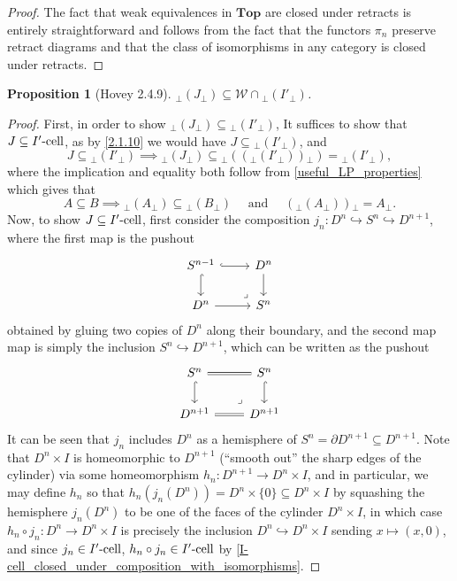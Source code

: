 \documentclass{amsart}
\theoremstyle{plain}
\newtheorem{proposition}[theorem]{Proposition}
\theoremstyle{definition}
\newcommand{\Top}{\mbf{Top}}
\newcommand{\sseq}{\subseteq}
\newcommand{\0}{\mathbf{0}}
\newcommand{\p}{{_\perp}}
\newcommand{\into}{\hookrightarrow}
\newcommand{\cW}{\mathcal W}
\newcommand{\mbf}[1]{\mathbf{#1}}
\renewcommand{\(}{\left(}
\renewcommand{\)}{\right)}
\newcommand{\cell}{\text-\mathrm{cell}}
\begin{document}
\begin{proof}
  The fact that weak equivalences in $\Top$ are closed under retracts is entirely straightforward and follows from the fact that the functors $\pi_n$ preserve retract diagrams and that the class of isomorphisms in any category is closed under retracts.
\end{proof}

\begin{proposition}[Hovey 2.4.9]\label{2.4.9}
  ${\p({J}\p)}\sseq\cW\cap {\p( I'\p )}$.
\end{proposition}
\begin{proof}
  First, in order to show ${\p(J\p)}\sseq{\p( I'\p )}$, It suffices to show that $J\sseq I'\cell$, as by \autoref{2.1.10} we would have $J\sseq{\p( I'\p )}$, and
  \[J\sseq {\p( I'\p )}\implies{\p(J\p)}\sseq{\p((\p( I'\p ))\p)}={\p( I'\p )},\]
  where the implication and equality both follow from \autoref{useful_LP_properties} which gives that
  \[A\sseq B\implies {\p(A\p)}\sseq{\p(B\p)}\quad\text{ and }\quad(\p({A}\p))\p=A\p.\]
  Now, to show $J\sseq I'\cell$, first consider the composition $j_n:D^n\into S^n\into D^{n+1}$, where the first map is the pushout
  \[\begin{tikzcd}
    {S^{n-1}} & {D^n} \\
    {D^n} & {S^n}
    \arrow[hook, from=1-1, to=1-2]
    \arrow[hook, from=1-1, to=2-1]
    \arrow[from=2-1, to=2-2]
    \arrow[from=1-2, to=2-2]
    \arrow["\ulcorner"{anchor=center, pos=0.125, rotate=180}, draw=none, from=2-2, to=1-1]
  \end{tikzcd}\]
  obtained by gluing two copies of $D^n$ along their boundary, and the second map map is simply the inclusion $S^n\into D^{n+1}$, which can be written as the pushout
  \[\begin{tikzcd}
    {S^n} & {S^n} \\
    {D^{n+1}} & {D^{n+1}}
    \arrow[Rightarrow, no head, from=1-1, to=1-2]
    \arrow[hook, from=1-1, to=2-1]
    \arrow[Rightarrow, no head, from=2-1, to=2-2]
    \arrow[hook, from=1-2, to=2-2]
    \arrow["\ulcorner"{anchor=center, pos=0.125, rotate=180}, draw=none, from=2-2, to=1-1]
  \end{tikzcd}\]
  It can be seen that $j_n$ includes $D^n$ as a hemisphere of $S^n=\partial D^{n+1}\sseq D^{n+1}$. Note that $D^{n}\times I$ is homeomorphic to $D^{n+1}$ (``smooth out'' the sharp edges of the cylinder) via some homeomorphism $h_n:D^{n+1}\to D^n\times I$, and in particular, we may define $h_n$ so that $h_n(j_n(D^n))= D^n\times\{0\}\sseq D^n\times I$ by squashing the hemisphere $j_n(D^n)$ to be one of the faces of the cylinder $D^n\times I$, in which case $h_n\circ j_n:D^n\to D^n\times I$ is precisely the inclusion $D^n\into D^n\times I$ sending $x\mapsto (x,0)$, and since $j_n\in I'\cell$, $h_n\circ j_n\in I'\cell$ by \autoref{I-cell_closed_under_composition_with_isomorphisms}.


\end{proof}
\end{document}
